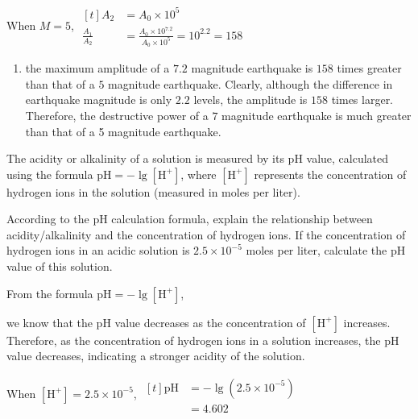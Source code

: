\documentclass{report}
\begin{document}
\begin{question}
\begin{tasks}[label=(\alph*)]
                        When $M=5$, $\begin{aligned}[t]
                            A_2 &= A_0 \times 10^5 \\
                            \frac{A_1}{A_2} &= \frac{A_0 \times 10^7.2}{A_0 \times 10^{5}} = 10^{2.2} = 158
                        \end{aligned}$
                        \vspace{0.5em}
                        \begin{enumerate}[label=$\therefore$, leftmargin=*]
                            \item the maximum amplitude of a $7.2$ magnitude earthquake is $158$ times greater than that of a $5$ magnitude earthquake. Clearly, although the difference in earthquake magnitude is only $2.2$ levels, the amplitude is $158$ times larger. Therefore, the destructive power of a $7$ magnitude earthquake is much greater than that of a 5 magnitude earthquake.
                        \end{enumerate}
            \end{tasks}
        \end{question}

        \begin{question}
            The acidity or alkalinity of a solution is measured by its $\mathrm{pH}$ value, calculated using the formula $\mathrm{pH}=-\lg \left[\mathrm{H}^{+}\right]$, where $\left[\mathrm{H}^{+}\right]$ represents the concentration of hydrogen ions in the solution (measured in moles per liter).
            \begin{tasks}[label=(\alph*)]
                \task According to the $\mathrm{pH}$ calculation formula, explain the relationship between acidity/alkalinity and the concentration of hydrogen ions.
                \task If the concentration of hydrogen ions in an acidic solution is $2.5 \times 10^{-5}$ moles per liter, calculate the $\mathrm{pH}$ value of this solution.
            \end{tasks}

            \sol{}
            \begin{tasks}[label=(\alph*)]
                \task From the formula $\mathrm{pH}=-\lg \left[\mathrm{H}^{+}\right]$, 
                
                we know that the $\mathrm{pH}$ value decreases as the concentration of $\left[\mathrm{H}^{+}\right]$ increases. Therefore, as the concentration of hydrogen ions in a solution increases, the $\mathrm{pH}$ value decreases, indicating a stronger acidity of the solution.

                \task When $\left[\mathrm{H}^{+}\right]=2.5 \times 10^{-5}$, $\begin{aligned}[t]
                \mathrm{pH} & =-\lg \left(2.5 \times 10^{-5}\right) \\
                & =4.602
                \end{aligned}$
            \end{tasks}
        \end{question}
\end{document}
